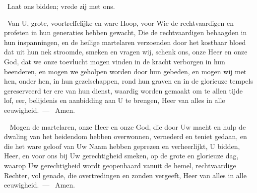 \documentclass[12pt,twoside,a5paper]{article}
\begin{document}
\begin{halfparskip}
  \rr~Laat ons bidden; vrede zij met ons.

  \cc~Van U, grote, voortreffelijke en ware Hoop, voor Wie de rechtvaardigen en profeten in hun generaties hebben gewacht, Die de rechtvaardigen behaagden in hun inspanningen, en de heilige martelaren verzoenden door het kostbaar bloed dat uit hun nek stroomde, smeken en vragen wij, schenk ons, onze Heer en onze God, dat we onze toevlucht mogen vinden in de kracht verborgen in hun beenderen, en mogen we geholpen worden door hun gebeden, en mogen wij met hen, onder hen, in hun gezelschappen, rond hun graven en in de glorieuze tempels gereserveerd ter ere van hun dienst, waardig worden gemaakt om te allen tijde lof, eer, belijdenis en aanbidding aan U te brengen, Heer van alles in alle eeuwigheid.~--- \rr~Amen.

  \cc~ Mogen de martelaren, onze Heer en onze God, die door Uw macht en hulp de dwaling van het heidendom hebben overwonnen, vernederd en teniet gedaan, en die het ware geloof van Uw Naam hebben geprezen en verheerlijkt, U bidden, Heer, en voor ons bij Uw gerechtigheid smeken, op de grote en glorieuze dag, waarop Uw gerechtigheid wordt geopenbaard vanuit de hemel, rechtvaardige Rechter, vol genade, die overtredingen en zonden vergeeft, Heer van alles in alle eeuwigheid.~--- \rr~Amen.
\end{halfparskip}



\end{document}
